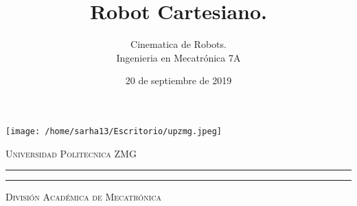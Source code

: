 \documentclass[letter,operight,12pt,spanish]{report}
\title{\textbf{Robot Cartesiano.}}
\author{Cinematica de Robots.\\
		Ingenieria en Mecatr\'onica 7A}
\date{20 de septiembre de 2019}
\begin{document}
\thispagestyle{empty} %
%
%
%
%
%
%
%
%
%
%
%
%
%
%
%
%
\begin{minipage}[c][0.15\textheight][c]{0.14\textwidth}
    \begin{center}
\texttt{[image: /home/sarha13/Escritorio/upzmg.jpeg]} %
    \end{center}
\end{minipage}
%
%
%
%
%
%
%
%
%
%
%
%
%
%
%
\begin{minipage}[c][0.17\textheight][t]{0.7\textwidth}
    \begin{center}
        {\scshape \Huge Universidad Politecnica ZMG} %
        \vspace{.5cm}   %
        \hrule height2.5pt  %
        \vspace{.1cm}    %
        \hrule height1pt  %
        \vspace{.4cm}   %
        {\scshape \LARGE Divisi\'on Acad\'emica de Mecatr\'onica}  %
    \end{center}
\end{minipage}
%
%
%
%
%
%
%
%
%
%
%
%
%
%
%
%
%
%
%
%
%
%
%
%
%
%
%
%
%
%
%
\end{document}
